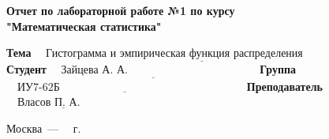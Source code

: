 \begin{titlepage}
    \begin{center}
        \Large\textbf{Отчет по лабораторной работе №1 по курсу\\ "Математическая статистика"}
    \end{center}

    \noindent\textbf{Тема} $\underline{\text{~~~Гистограмма и эмпирическая функция распределения~~~~~~~~~~~~~~~~~~}}$\newline\newline\newline
    \noindent\textbf{Студент} $\underline{\text{~~~Зайцева А. А.~~~~~~~~~~~~~~~~~~~~~~~~~~~~~~~~~~~}}$\newline\newline
    \noindent\textbf{Группа} $\underline{\text{~~~ИУ7-62Б~~~~~~~~~~~~~~~~~~~~~~~~~~~~~~~~~~~~~~~~~~~~~~~~~~}}$\newline\newline
    \noindent\textbf{Преподаватель} $\underline{\text{~~~Власов П. А.~~~~~~~~~~~}}$\newline

    \begin{center}
        \vfill
        Москва~---~\the\year
        ~г.
    \end{center}
    \restoregeometry
\end{titlepage}

